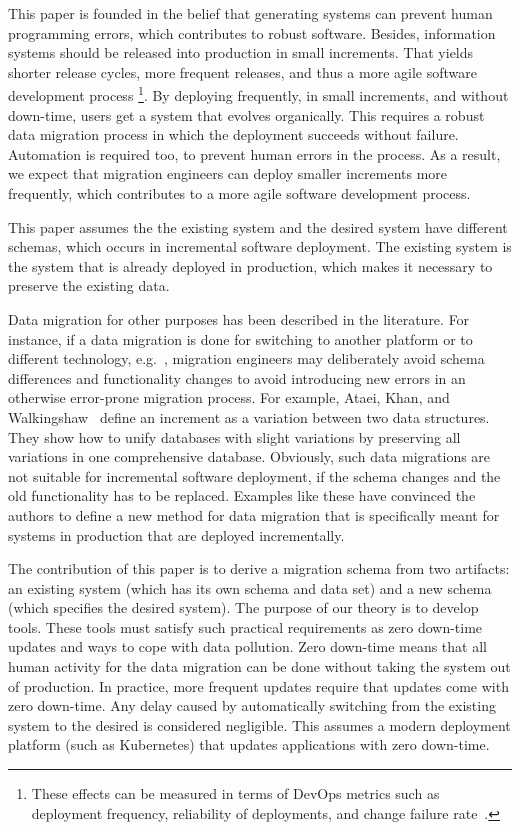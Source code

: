 \documentclass{elsarticle}
\begin{document}
   This paper is founded in the belief that generating systems can prevent human programming errors, which contributes to robust software.
   Besides, information systems should be released into production in small increments.
   That yields shorter release cycles, more frequent releases, and thus a more agile software development process%
   \footnote{These effects can be measured in terms of DevOps metrics such as
   deployment frequency,
   reliability of deployments, and
   change failure rate~\cite{DevOps2021}.}.
   By deploying frequently, in small increments, and without down-time,
   users get a system that evolves organically.
   This requires a robust data migration process in which the deployment succeeds without failure.
   Automation is required too, to prevent human errors in the process.
   As a result, we expect that migration engineers can deploy smaller increments more frequently, which contributes to a more agile software development process.
   
   This paper assumes the the existing system and the desired system have different schemas,
   which occurs in incremental software deployment.
   The existing system is the system that is already deployed in production,
   which makes it necessary to preserve the existing data.

   Data migration for other purposes has been described in the literature.
   For instance, if a data migration is done for switching to another platform or to different technology,
   e.g.~\cite{Gholami2016,Bisbal1999},
   migration engineers may deliberately avoid schema differences and functionality changes to avoid introducing new errors in an otherwise error-prone migration process.
   For example, Ataei, Khan, and Walkingshaw~\cite{Ataei2021,Walkingshaw2014} define an increment as a variation between two data structures.
   They show how to unify databases with slight variations by preserving all variations in one comprehensive database.
   Obviously, such data migrations are not suitable for incremental software deployment,
   if the schema changes and the old functionality has to be replaced.
   Examples like these have convinced the authors to define a new method for data migration that is specifically meant for systems in production that are
   deployed incrementally.
   
   The contribution of this paper is to derive a migration schema from two artifacts: an existing system
   (which has its own schema and data set) and a new schema (which specifies the desired system).
   The purpose of our theory is to develop tools.
   These tools must satisfy such practical requirements as
   zero down-time updates and ways to cope with data pollution.
   Zero down-time means that all human activity for the data migration can be done without taking the system out of production.
   In practice, more frequent updates require that updates come with zero down-time.
   Any delay caused by automatically switching from the existing system to the desired is considered negligible.
   This assumes a modern deployment platform (such as Kubernetes) that updates applications with zero down-time.
   
\end{document}
